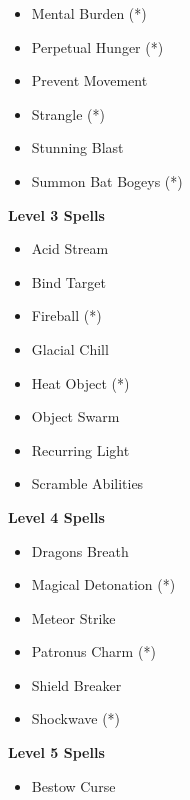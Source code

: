 \begin{multicols}{4}
{\begin{itemize}[itemsep=0em]
\item Mental Burden (*) 

\item Perpetual Hunger (*) 

\item Prevent Movement

\item Strangle (*) 

\item Stunning Blast

\item Summon Bat Bogeys (*) 


\end{itemize}
\textbf{Level 3 Spells}
\begin{itemize}[itemsep=0em]
\renewcommand\labelitemi{-}
\item Acid Stream

\item Bind Target

\item Fireball (*) 

\item Glacial Chill

\item Heat Object (*) 

\item Object Swarm

\item Recurring Light

\item Scramble Abilities


\end{itemize}
\textbf{Level 4 Spells}
\begin{itemize}[itemsep=0em]
\renewcommand\labelitemi{-}
\item Dragon{\apos}s Breath

\item Magical Detonation (*) 

\item Meteor Strike

\item Patronus Charm (*) 

\item Shield Breaker

\item Shockwave (*) 


\end{itemize}
\textbf{Level 5 Spells}
\begin{itemize}[itemsep=0em]
\renewcommand\labelitemi{-}
\item Bestow Curse


\end{itemize}}
\end{multicols}
